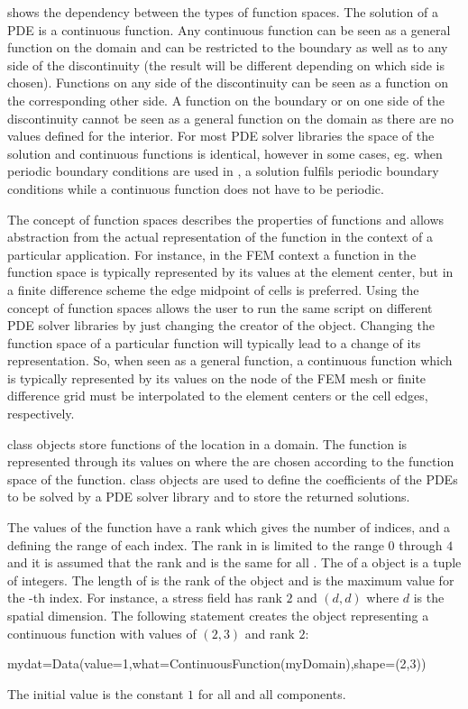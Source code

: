  shows the dependency between the types of function spaces. 
The solution of a PDE is a continuous function. Any continuous function can be seen as a general function
on the domain and can be restricted to the boundary as well as to any side of the 
discontinuity (the result will be different depending on 
which side is chosen). Functions on any side of the  
discontinuity can be seen as a function on the corresponding other side. 
A function on the boundary or on one side of
the discontinuity cannot be seen as a general function on the domain as there are no values 
defined for the interior. For most PDE solver libraries
the space of the solution and continuous functions is identical, however in some cases, eg.
when periodic boundary conditions are used in \finley, a solution 
fulfils periodic boundary conditions while a continuous function does not have to be periodic.
   
The concept of function spaces describes the properties of 
functions and allows abstraction from the actual representation 
of the function in the context of a particular application. For instance, 
in the FEM context a
function in the \Function function space
is typically represented by its values at the element center, 
but in a finite difference scheme the edge midpoint of cells is preferred. 
Using the concept of function spaces 
allows the user to run the same script on different
PDE solver libraries by just changing the creator of the \Domain object.     
Changing the function space of a particular function
will typically lead to a change of its representation. 
So, when seen as a general function,
a continuous function which is typically represented by its values
on the node of the FEM mesh or finite difference grid 
must be interpolated to the element centers or the cell edges,
respectively.

\Data class objects store functions of the location in a domain. 
The function is represented through its values on \DataSamplePoints where
the \DataSamplePoints are chosen according to the function space 
of the function.  
\Data class objects are used to define the coefficients
of the PDEs to be solved by a PDE solver library 
and to store the returned solutions.

The values of the function have a rank which gives the
number of indices, and a \Shape defining the range of each index.
The rank in \escript is limited to the range $0$ through $4$ and
it is assumed that the rank and \Shape is the same for all \DataSamplePoints.
The \Shape of a \Data object is a tuple  of integers. The length
of  is the rank of the \Data object and  is the maximum
value for the -th index.
For instance, a stress field has rank $2$ and 
\Shape $(d,d)$ where $d$ is the spatial dimension.
The following statement creates the \Data object
 representing a 
continuous function with values 
of \Shape $(2,3)$ and rank $2$:
\begin{python}
mydat=Data(value=1,what=ContinuousFunction(myDomain),shape=(2,3))
\end{python}
The initial value is the constant $1$ for all \DataSamplePoints and
all components.

